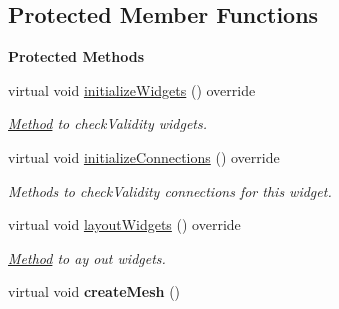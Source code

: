 \subsection*{Protected Member Functions}
\begin{Indent}\textbf{ Protected Methods}\par
\begin{DoxyCompactItemize}
\item 
\mbox{\label{classrev_1_1_view_1_1_create_mesh_widget_add7f87fc87878f248f2ccb26f5bab838}} 
virtual void \mbox{\hyperlink{classrev_1_1_view_1_1_create_mesh_widget_add7f87fc87878f248f2ccb26f5bab838}{initialize\+Widgets}} () override
\begin{DoxyCompactList}\small\item\em \mbox{\hyperlink{struct_method}{Method}} to check\+Validity widgets. \end{DoxyCompactList}\item 
\mbox{\label{classrev_1_1_view_1_1_create_mesh_widget_af128ba84d97a464bcb14cbe5a82b8130}} 
virtual void \mbox{\hyperlink{classrev_1_1_view_1_1_create_mesh_widget_af128ba84d97a464bcb14cbe5a82b8130}{initialize\+Connections}} () override
\begin{DoxyCompactList}\small\item\em Methods to check\+Validity connections for this widget. \end{DoxyCompactList}\item 
\mbox{\label{classrev_1_1_view_1_1_create_mesh_widget_ad86a3a6b5358b0e924e11eef8e1ca537}} 
virtual void \mbox{\hyperlink{classrev_1_1_view_1_1_create_mesh_widget_ad86a3a6b5358b0e924e11eef8e1ca537}{layout\+Widgets}} () override
\begin{DoxyCompactList}\small\item\em \mbox{\hyperlink{struct_method}{Method}} to ay out widgets. \end{DoxyCompactList}\item 
\mbox{\label{classrev_1_1_view_1_1_create_mesh_widget_afbe7e3d99fcd4ba9660e6df9a93c5979}} 
virtual void {\bfseries create\+Mesh} ()
\end{DoxyCompactItemize}
\end{Indent}
